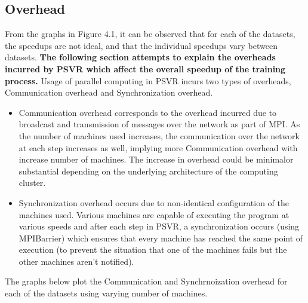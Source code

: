 \documentclass[12pt]{article}
\begin{document}
\subsection{Overhead}
\label{Overhead}
From the graphs in Figure 4.1, it can be observed that for each of the datasets, the speedups are not ideal, and that the individual speedups vary between datasets.
{\bf The following section attempts to explain the overheads incurred by PSVR which affect the overall speedup of the training process.}
\newline\newline
Usage of parallel computing in PSVR incurs two types of overheads, Communication overhead and Synchronization overhead.
\begin{itemize}
\item Communication overhead corresponds to the overhead incurred due to broadcast and transmission of messages over the network as part of MPI. 
\newline
As the number of machines used increases, the communication over the network at each step increases as well, implying more Communication overhead with increase number of machines. The increase in overhead could be minimal\footnotemark or substantial depending on the underlying architecture of the computing cluster.
\item Synchronization overhead occurs due to non-identical configuration of the machines used. Various machines are capable of executing the program at various speeds and after each step in PSVR, a synchronization occurs (using MPIBarrier) which ensures that every machine has reached the same point of execution (to prevent the situation that one of the machines fails but the other machines aren't notified).
\end{itemize}
The graphs below plot the Communication and Synchrnoization overhead for each of the datasets using varying number of machines.
\end{document}
